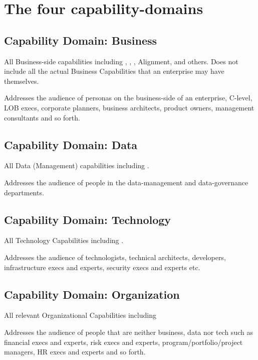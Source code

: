 \section{The four capability-domains}


\subsection{Capability Domain: Business}

All Business-side capabilities including ,
 ,
 , Alignment,
 and others.
Does not include all the actual Business Capabilities  that
an enterprise may have themselves.

Addresses the audience of personas on the business-side of an enterprise, C-level, LOB execs, corporate planners,
business architects, product owners, management consultants and so forth.

\subsection{Capability Domain: Data}

All Data (Management) capabilities including .

Addresses the audience of people in the data-management and data-governance departments.

\subsection{Capability Domain: Technology}

All Technology Capabilities including .

Addresses the audience of technologists, technical architects, developers, infrastructure execs and experts,
security execs and experts etc.

\subsection{Capability Domain: Organization}

All relevant Organizational Capabilities including 

Addresses the audience of people that are neither business, data nor tech such as financial execs and experts, risk
execs and experts, program/portfolio/project managers, HR execs and experts and so forth.

